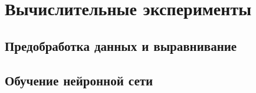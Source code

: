 \documentclass{main.tex}[subfiles]
\begin{document}
\section{Вычислительные эксперименты}
\subsection{Предобработка данных и выравнивание}
\subsection{Обучение нейронной сети}
\end{document}
